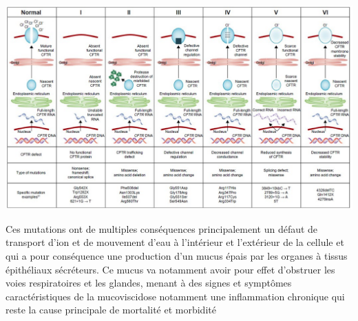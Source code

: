 \begin{center}
\includegraphics[scale=0.4]{gfx/mutation.jpg} 
       \label{mutation}
\end{center}
 
Ces mutations ont de multiples conséquences principalement un défaut de transport d’ion et de mouvement d’eau à l’intérieur et l’extérieur de la cellule et qui a pour conséquence une production d’un mucus épais par les organes à tissus épithéliaux sécréteurs. Ce mucus va notamment avoir pour effet d’obstruer les voies respiratoires et les glandes, menant à des signes et symptômes caractéristiques de la mucoviscidose notamment une inflammation chronique qui reste la cause principale de mortalité et morbidité



